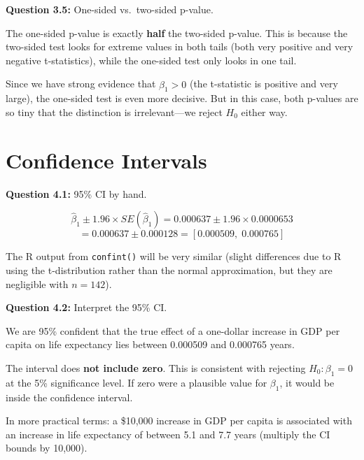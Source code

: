 \documentclass[11pt,letterpaper]{article}
\begin{document}
\textbf{Question 3.5:} One-sided vs.\ two-sided p-value.

\begin{answer}
The one-sided p-value is exactly \textbf{half} the two-sided p-value. This is because the two-sided test looks for extreme values in both tails (both very positive and very negative t-statistics), while the one-sided test only looks in one tail.

Since we have strong evidence that $\hat{\beta}_1 > 0$ (the t-statistic is positive and very large), the one-sided test is even more decisive. But in this case, both p-values are so tiny that the distinction is irrelevant---we reject $H_0$ either way.
\end{answer}

\newpage

\section{Confidence Intervals}

\textbf{Question 4.1:} 95\% CI by hand.

\begin{answer}
\[
\hat{\beta}_1 \pm 1.96 \times SE(\hat{\beta}_1) = 0.000637 \pm 1.96 \times 0.0000653
\]
\[
= 0.000637 \pm 0.000128 = [0.000509,\; 0.000765]
\]

The R output from \texttt{confint()} will be very similar (slight differences due to R using the t-distribution rather than the normal approximation, but they are negligible with $n = 142$).
\end{answer}

\textbf{Question 4.2:} Interpret the 95\% CI.

\begin{answer}
We are 95\% confident that the true effect of a one-dollar increase in GDP per capita on life expectancy lies between 0.000509 and 0.000765 years.

The interval does \textbf{not include zero}. This is consistent with rejecting $H_0: \beta_1 = 0$ at the 5\% significance level. If zero were a plausible value for $\beta_1$, it would be inside the confidence interval.

In more practical terms: a \$10,000 increase in GDP per capita is associated with an increase in life expectancy of between 5.1 and 7.7 years (multiply the CI bounds by 10,000).
\end{answer}
\end{document}
